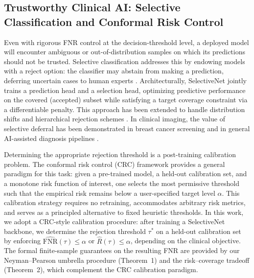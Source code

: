 \subsection{Trustworthy Clinical AI: Selective Classification and Conformal Risk Control}

Even with rigorous FNR control at the decision-threshold level, a deployed model will encounter ambiguous or out-of-distribution samples on which its predictions should not be trusted. Selective classification addresses this by endowing models with a reject option: the classifier may abstain from making a prediction, deferring uncertain cases to human experts \cite{el2010foundations}. Architecturally, SelectiveNet \cite{geifman2019selectivenet, geifman2017selective} jointly trains a prediction head and a selection head, optimizing predictive performance on the covered (accepted) subset while satisfying a target coverage constraint via a differentiable penalty. This approach has been extended to handle distribution shifts and hierarchical rejection schemes \cite{goren2024hierarchical}. In clinical imaging, the value of selective deferral has been demonstrated in breast cancer screening \cite{leibig2022combining} and in general AI-assisted diagnosis pipelines \cite{dvijotham2023enhancing}.

Determining the appropriate rejection threshold is a post-training calibration problem. The conformal risk control (CRC) framework \cite{angelopoulos2022conformal, bates2021distribution} provides a general paradigm for this task: given a pre-trained model, a held-out calibration set, and a monotone risk function of interest, one selects the most permissive threshold such that the empirical risk remains below a user-specified target level $\alpha$. This calibration strategy requires no retraining, accommodates arbitrary risk metrics, and serves as a principled alternative to fixed heuristic thresholds. In this work, we adopt a CRC-style calibration procedure: after training a SelectiveNet backbone, we determine the rejection threshold $\tau^*$ on a held-out calibration set by enforcing $\widehat{\mathrm{FNR}}(\tau) \leq \alpha$ or $\hat{R}(\tau) \leq \alpha$, depending on the clinical objective. The formal finite-sample guarantees on the resulting FNR are provided by our Neyman--Pearson umbrella procedure (Theorem~1) and the risk--coverage tradeoff (Theorem~2), which complement the CRC calibration paradigm.

